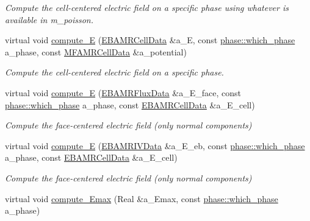 \begin{DoxyCompactItemize}
\begin{DoxyCompactList}\small\item\em Compute the cell-\/centered electric field on a specific phase using whatever is available in m\+\_\+poisson. \end{DoxyCompactList}\item 
virtual void \hyperlink{classtime__stepper_ae4a39911e42a45fd2ac42d9ff6596918}{compute\+\_\+E} (\hyperlink{type__definitions_8H_a7e610f301989e5e07781c5e338bdb7c3}{E\+B\+A\+M\+R\+Cell\+Data} \&a\+\_\+E, const \hyperlink{namespacephase_a23c76f548a5eb1955ed8c929c541108b}{phase\+::which\+\_\+phase} a\+\_\+phase, const \hyperlink{type__definitions_8H_aced885351d40daa466564acbee4042d3}{M\+F\+A\+M\+R\+Cell\+Data} \&a\+\_\+potential)
\begin{DoxyCompactList}\small\item\em Compute the cell-\/centered electric field on a specific phase. \end{DoxyCompactList}\item 
virtual void \hyperlink{classtime__stepper_a1e13d9e56615820aa1be3a1298d703f0}{compute\+\_\+E} (\hyperlink{type__definitions_8H_aadad278b2e5d3d4abcf9032f90ba78c3}{E\+B\+A\+M\+R\+Flux\+Data} \&a\+\_\+\+E\+\_\+face, const \hyperlink{namespacephase_a23c76f548a5eb1955ed8c929c541108b}{phase\+::which\+\_\+phase} a\+\_\+phase, const \hyperlink{type__definitions_8H_a7e610f301989e5e07781c5e338bdb7c3}{E\+B\+A\+M\+R\+Cell\+Data} \&a\+\_\+\+E\+\_\+cell)
\begin{DoxyCompactList}\small\item\em Compute the face-\/centered electric field (only normal components) \end{DoxyCompactList}\item 
virtual void \hyperlink{classtime__stepper_af1bf44be1dcd5fc880a8cbdcb1af6f4a}{compute\+\_\+E} (\hyperlink{type__definitions_8H_a6b8fa905d55cbb491b52180386f0e0c1}{E\+B\+A\+M\+R\+I\+V\+Data} \&a\+\_\+\+E\+\_\+eb, const \hyperlink{namespacephase_a23c76f548a5eb1955ed8c929c541108b}{phase\+::which\+\_\+phase} a\+\_\+phase, const \hyperlink{type__definitions_8H_a7e610f301989e5e07781c5e338bdb7c3}{E\+B\+A\+M\+R\+Cell\+Data} \&a\+\_\+\+E\+\_\+cell)
\begin{DoxyCompactList}\small\item\em Compute the face-\/centered electric field (only normal components) \end{DoxyCompactList}\item 
virtual void \hyperlink{classtime__stepper_ab7aab82f224bd74e3d5da651feeda805}{compute\+\_\+\+Emax} (Real \&a\+\_\+\+Emax, const \hyperlink{namespacephase_a23c76f548a5eb1955ed8c929c541108b}{phase\+::which\+\_\+phase} a\+\_\+phase)

\end{DoxyCompactItemize}
